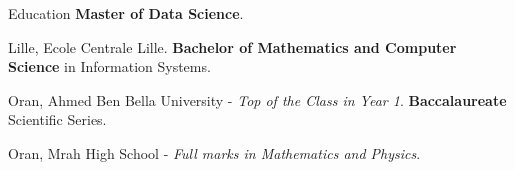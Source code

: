 \begin{rubric}{Education}
    \entry*[2024 -- 2026]%
    \textbf{Master of Data Science}.
    \par Lille, Ecole Centrale Lille.
    \entry*[2021 -- 2024]%
    \textbf{Bachelor of Mathematics and Computer Science} in Information Systems.\par
    Oran, Ahmed Ben Bella University - \emph{Top of the Class in Year 1}.
    \entry*[2020 -- 2021]%
    \textbf{Baccalaureate} Scientific Series.\par
    Oran, Mrah High School - \emph{Full marks in Mathematics and Physics}.
\end{rubric}